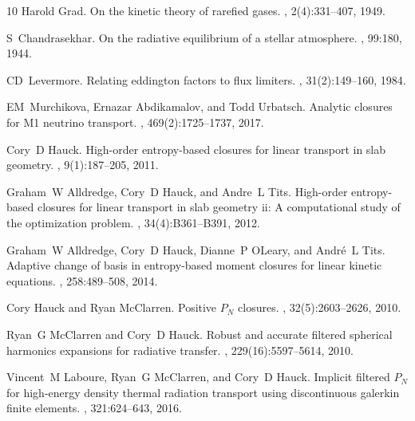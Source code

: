 \documentclass[11pt]{article}
\numberwithin{equation}{section}
\begin{document}
\begin{thebibliography}{10}
Harold Grad.
\newblock On the kinetic theory of rarefied gases.
, 2(4):331--407,
  1949.

S~Chandrasekhar.
\newblock On the radiative equilibrium of a stellar atmosphere.
, 99:180, 1944.

CD~Levermore.
\newblock Relating eddington factors to flux limiters.
,
  31(2):149--160, 1984.

EM~Murchikova, Ernazar Abdikamalov, and Todd Urbatsch.
\newblock Analytic closures for {M}1 neutrino transport.
,
  469(2):1725--1737, 2017.

Cory~D Hauck.
\newblock High-order entropy-based closures for linear transport in slab
  geometry.
, 9(1):187--205, 2011.

Graham~W Alldredge, Cory~D Hauck, and Andre~L Tits.
\newblock High-order entropy-based closures for linear transport in slab
  geometry ii: A computational study of the optimization problem.
, 34(4):B361--B391, 2012.

Graham~W Alldredge, Cory~D Hauck, Dianne~P OLeary, and Andr{\'e}~L Tits.
\newblock Adaptive change of basis in entropy-based moment closures for linear
  kinetic equations.
, 258:489--508, 2014.

Cory Hauck and Ryan McClarren.
\newblock Positive ${P_N}$ closures.
, 32(5):2603--2626, 2010.

Ryan~G McClarren and Cory~D Hauck.
\newblock Robust and accurate filtered spherical harmonics expansions for
  radiative transfer.
, 229(16):5597--5614, 2010.

Vincent~M Laboure, Ryan~G McClarren, and Cory~D Hauck.
\newblock Implicit filtered ${P}_{N}$ for high-energy density thermal radiation
  transport using discontinuous galerkin finite elements.
, 321:624--643, 2016.


\end{thebibliography}
\end{document}
